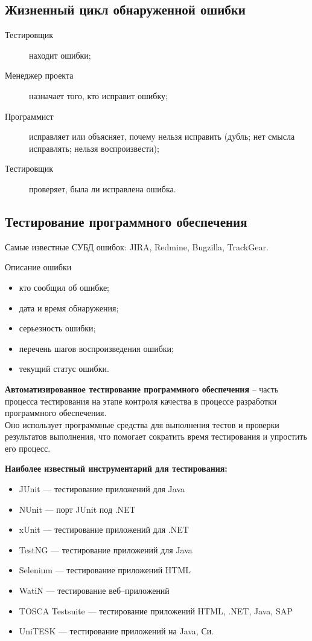 \subsection{Жизненный цикл обнаруженной ошибки}
\begin{description}
  \item[Тестировщик] находит ошибки;
  \item[Менеджер проекта] назначает того, кто исправит ошибку;
  \item[Программист] исправляет или объясняет, почему нельзя исправить (дубль; нет смысла исправлять; нельзя воспроизвести);
  \item[Тестировщик] проверяет, была ли исправлена ошибка.
\end{description}
\subsection{Тестирование программного обеспечения}
Самые известные СУБД ошибок: JIRA, Redmine, Bugzilla, TrackGear.
\begin{center}
  Описание ошибки
\end{center}
\begin{itemize}
  \item кто сообщил об ошибке;
  \item дата и время обнаружения;
  \item серьезность ошибки;
  \item перечень шагов воспроизведения ошибки;
  \item текущий статус ошибки.
\end{itemize}
\textbf{Автоматизированное тестирование программного обеспечения} -- часть процесса тестирования на этапе контроля качества в процессе разработки программного обеспечения.
\\Оно использует программные средства для выполнения тестов и проверки результатов выполнения, что помогает сократить время тестирования и упростить его процесс.
\begin{center}
\textbf{Наиболее известный инструментарий для тестирования:}
\end{center}
\begin{itemize}
  \item JUnit — тестирование приложений для Java
  \item NUnit — порт JUnit под .NET
  \item xUnit — тестирование приложений для .NET
  \item TestNG — тестирование приложений для Java
  \item Selenium — тестирование приложений HTML
  \item WatiN — тестирование веб--приложений
  \item TOSCA Testsuite — тестирование приложений HTML, .NET, Java, SAP
  \item UniTESK — тестирование приложений на Java, Си.
\end{itemize}
